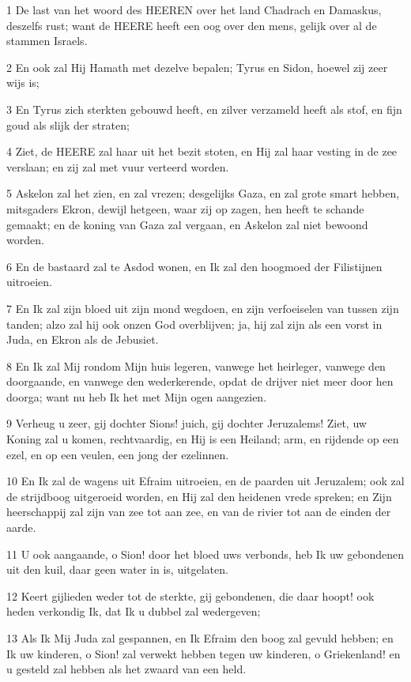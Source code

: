 \par 1 De last van het woord des HEEREN over het land Chadrach en Damaskus, deszelfs rust; want de HEERE heeft een oog over den mens, gelijk over al de stammen Israels.
\par 2 En ook zal Hij Hamath met dezelve bepalen; Tyrus en Sidon, hoewel zij zeer wijs is;
\par 3 En Tyrus zich sterkten gebouwd heeft, en zilver verzameld heeft als stof, en fijn goud als slijk der straten;
\par 4 Ziet, de HEERE zal haar uit het bezit stoten, en Hij zal haar vesting in de zee verslaan; en zij zal met vuur verteerd worden.
\par 5 Askelon zal het zien, en zal vrezen; desgelijks Gaza, en zal grote smart hebben, mitsgaders Ekron, dewijl hetgeen, waar zij op zagen, hen heeft te schande gemaakt; en de koning van Gaza zal vergaan, en Askelon zal niet bewoond worden.
\par 6 En de bastaard zal te Asdod wonen, en Ik zal den hoogmoed der Filistijnen uitroeien.
\par 7 En Ik zal zijn bloed uit zijn mond wegdoen, en zijn verfoeiselen van tussen zijn tanden; alzo zal hij ook onzen God overblijven; ja, hij zal zijn als een vorst in Juda, en Ekron als de Jebusiet.
\par 8 En Ik zal Mij rondom Mijn huis legeren, vanwege het heirleger, vanwege den doorgaande, en vanwege den wederkerende, opdat de drijver niet meer door hen doorga; want nu heb Ik het met Mijn ogen aangezien.
\par 9 Verheug u zeer, gij dochter Sions! juich, gij dochter Jeruzalems! Ziet, uw Koning zal u komen, rechtvaardig, en Hij is een Heiland; arm, en rijdende op een ezel, en op een veulen, een jong der ezelinnen.
\par 10 En Ik zal de wagens uit Efraim uitroeien, en de paarden uit Jeruzalem; ook zal de strijdboog uitgeroeid worden, en Hij zal den heidenen vrede spreken; en Zijn heerschappij zal zijn van zee tot aan zee, en van de rivier tot aan de einden der aarde.
\par 11 U ook aangaande, o Sion! door het bloed uws verbonds, heb Ik uw gebondenen uit den kuil, daar geen water in is, uitgelaten.
\par 12 Keert gijlieden weder tot de sterkte, gij gebondenen, die daar hoopt! ook heden verkondig Ik, dat Ik u dubbel zal wedergeven;
\par 13 Als Ik Mij Juda zal gespannen, en Ik Efraim den boog zal gevuld hebben; en Ik uw kinderen, o Sion! zal verwekt hebben tegen uw kinderen, o Griekenland! en u gesteld zal hebben als het zwaard van een held.
